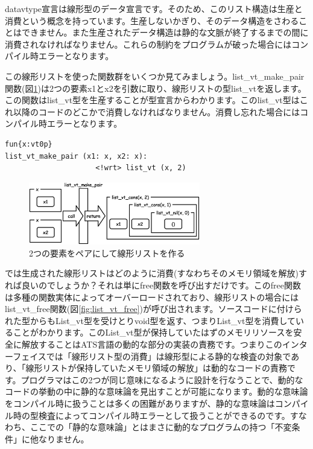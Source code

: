 \documentclass{ipsjprosym}
\begin{document}
datavtype宣言は線形型のデータ宣言です。そのため、このリスト構造は生産と消費という概念を持っています。生産しないかぎり、そのデータ構造をさわることはできません。また生産されたデータ構造は静的な文脈が終了するまでの間に消費されなければなりません。これらの制約をプログラムが破った場合にはコンパイル時エラーとなります。

この線形リストを使った関数群をいくつか見てみましょう。list\_vt\_make\_pair関数(図\ref{fig:list_vt_make_pair})は2つの要素x1とx2を引数に取り、線形リストの型list\_vtを返します。この関数はlist\_vt型を生産することが型宣言からわかります。このlist\_vt型はこれ以降のコードのどこかで消費しなければなりません。消費し忘れた場合にはコンパイル時エラーとなります。

\vspace{3mm}
\begin{verbatim}
fun{x:vt0p}
list_vt_make_pair (x1: x, x2: x):
                     <!wrt> list_vt (x, 2)
\end{verbatim}
\vspace{3mm}

\begin{figure}[h]
\centering
\includegraphics[width=75mm]{draw/list_vt_make_pair.eps}
\caption{2つの要素をペアにして線形リストを作る}
\label{fig:list_vt_make_pair}
\end{figure}

では生成された線形リストはどのように消費(すなわちそのメモリ領域を解放)すれば良いのでしょうか？それは単にfree関数を呼び出すだけです。このfree関数は多種の関数実体によってオーバーロードされており、線形リストの場合にはlist\_vt\_free関数(図\ref{fig:list_vt_free})が呼び出されます。ソースコードに付けられた型からもList\_vt型を受けとりvoid型を返す、つまりList\_vt型を消費していることがわかります。このList\_vt型が保持していたはずのメモリリソースを安全に解放することはATS言語の動的な部分の実装の責務です。つまりこのインターフェイスでは「線形リスト型の消費」は線形型による静的な検査の対象であり、「線形リストが保持していたメモリ領域の解放」は動的なコードの責務です。プログラマはこの2つが同じ意味になるように設計を行なうことで、動的なコードの挙動の中に静的な意味論を見出すことが可能になります。動的な意味論をコンパイル時に扱うことは多くの困難がありますが、静的な意味論はコンパイル時の型検査によってコンパイル時エラーとして扱うことができるのです。すなわち、ここでの「静的な意味論」とはまさに動的なプログラムの持つ「不変条件」に他なりません。
\end{document}
